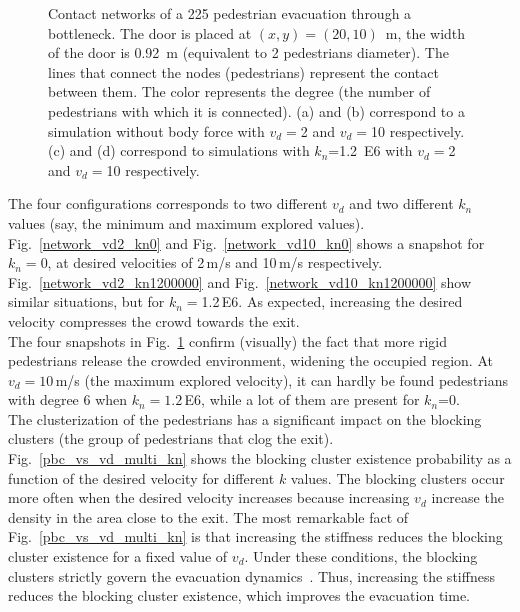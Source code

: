 \documentclass[preprint,12pt]{elsarticle}
\begin{document}
\begin{figure}[!htbp]
\caption[width=0.47\columnwidth]{Contact networks of a 225 pedestrian evacuation through a bottleneck. The door is placed at $(x,y)=(20,10)$~m, the width of the door is 0.92~m (equivalent to 2 pedestrian\textsc{}s diameter). The lines that connect the nodes (pedestrians) represent the contact between them. The color represents the degree (the number of pedestrians with which it is connected). (a) and (b) correspond to a simulation without body force with $v_d=$2 and $v_d=$10 respectively. (c) and (d) correspond to simulations with $k_n$=1.2~E6 with $v_d=$2 and $v_d=$10 respectively.}
\label{network_bottleneck}
\end{figure}



The four configurations corresponds to two different $v_d$ and two different $k_n$ values (say, the  minimum and maximum explored values). Fig.~\ref{network_vd2_kn0} and Fig.~\ref{network_vd10_kn0} shows a snapshot for $k_n=$0, at desired velocities of 2$\,$m/s and 10$\,$m/s respectively.    Fig.~\ref{network_vd2_kn1200000} and Fig.~\ref{network_vd10_kn1200000} show similar situations, but for  $k_n=$1.2$\,$E6. As expected, increasing the desired velocity compresses the crowd towards the exit. \\

The four snapshots in Fig.~\ref{network_bottleneck} confirm (visually) the fact that more rigid pedestrians release the crowded environment, widening the occupied region. At $v_d=10\,$m/s (the maximum explored velocity), it can hardly be found pedestrians with degree 6 when $k_n=1.2\,$E6, while a lot of them are present for $k_n$=0.\\

The clusterization of the pedestrians has a significant impact on the blocking clusters (the group of pedestrians that clog the exit).  Fig.~\ref{pbc_vs_vd_multi_kn} shows the blocking cluster existence probability as a function of the desired velocity for different $k$ values. The blocking clusters occur more often when the desired velocity increases because increasing $v_d$ increase the density in the area close to the exit. The most remarkable fact of Fig.~\ref{pbc_vs_vd_multi_kn} is that increasing the stiffness reduces the blocking cluster existence for a fixed value of $v_d$. Under these conditions, the blocking clusters strictly govern the evacuation dynamics~\cite{dorso_2005}. Thus, increasing the stiffness reduces the blocking cluster existence, which improves the evacuation time.\\
\end{document}
